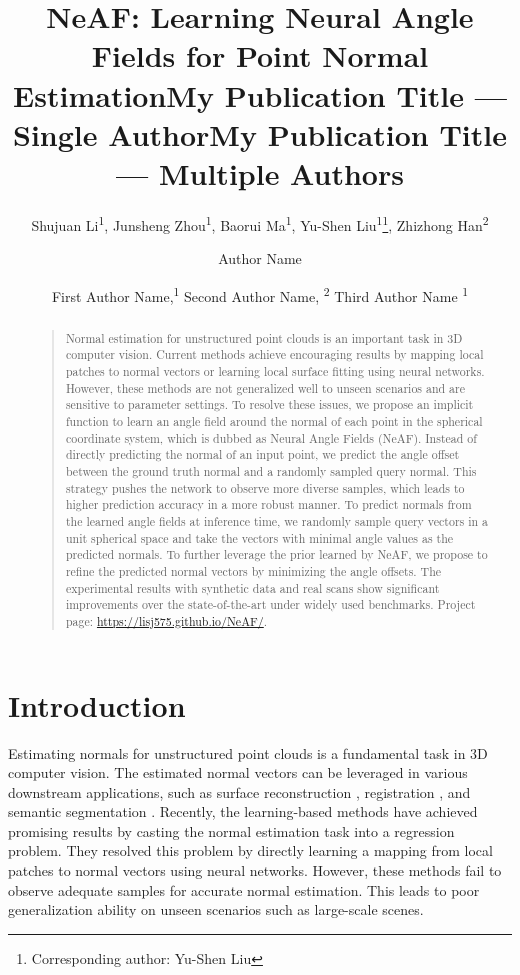 \documentclass[letterpaper]{article} \usepackage{aaai23}  \usepackage{times}  \usepackage{helvet}  \usepackage{courier}  \usepackage[hyphens]{url}  \usepackage{graphicx} \urlstyle{rm} \def\UrlFont{\rm}  \usepackage{natbib}  \usepackage{caption} \frenchspacing  \setlength{\pdfpagewidth}{8.5in} \setlength{\pdfpageheight}{11in} \usepackage{algorithm}
\title{NeAF: Learning Neural Angle Fields for Point Normal Estimation}
\author{
    Shujuan Li\textsuperscript{\rm 1}\equalcontrib, 
    Junsheng Zhou\textsuperscript{\rm 1}\equalcontrib, 
    Baorui Ma\textsuperscript{\rm 1},
    Yu-Shen Liu\textsuperscript{\rm 1}\thanks{Corresponding author: Yu-Shen Liu}, 
    Zhizhong Han\textsuperscript{\rm 2}
}
\title{My Publication Title --- Single Author}
\author {
    Author Name
}
\title{My Publication Title --- Multiple Authors}
\author {
First Author Name,\textsuperscript{\rm 1}
    Second Author Name, \textsuperscript{\rm 2}
    Third Author Name \textsuperscript{\rm 1}
}
\begin{document}
\frenchspacing
\maketitle

\begin{abstract}
\begin{quote}

Normal estimation for unstructured point clouds is an important task in 3D computer vision. Current methods achieve encouraging results by mapping local patches to normal vectors or learning local surface fitting using neural networks. However, these methods are not generalized well to unseen scenarios and are sensitive to parameter settings.
To resolve these issues, we propose an implicit function to learn an angle field around the normal of each point in the spherical coordinate system, which is dubbed as Neural Angle Fields (NeAF). Instead of directly predicting the normal of an input point, we predict the angle offset between the ground truth normal and a randomly sampled query normal. This strategy pushes the network to observe more diverse samples, which leads to higher prediction accuracy in a more robust manner. To predict normals from the learned angle fields at inference time, we randomly sample query vectors in a unit spherical space and take the vectors with minimal angle values as the predicted normals. To further leverage the prior learned by NeAF, we propose to refine the predicted normal vectors by minimizing the angle offsets. The experimental results with synthetic data and real scans show significant improvements over the state-of-the-art under widely used benchmarks. Project page: \url{https://lisj575.github.io/NeAF/}.

\end{quote}
\end{abstract}

\section{Introduction}

Estimating normals for unstructured point clouds is a fundamental task in 3D computer vision. The estimated normal vectors can be leveraged in various downstream applications, such as surface reconstruction \cite{MichaelKazhdan2006PoissonSR}, registration \cite{pomerleau2015review}, and semantic segmentation \cite{EleonoraGrilli2017AReviewOP}.  
Recently, the learning-based methods have achieved promising results by casting the normal estimation task into a regression problem. They resolved this problem by directly learning a  mapping from local patches to normal vectors using neural networks. However, these methods fail to observe adequate samples for accurate normal estimation. This leads to poor generalization ability on unseen scenarios such as large-scale scenes.
\end{document}
